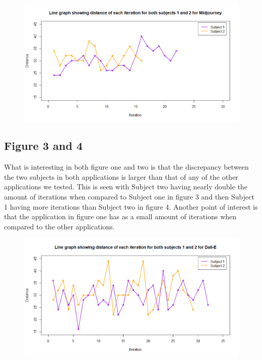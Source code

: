 \documentclass[]{report}
\begin{document}
\begin{figure}[!htbp]
	\centering
	\includegraphics[width=1\linewidth]{LineGraphMidJ}
	\caption{}
	\label{fig:linegraphmidj}
\end{figure}

\subsection{Figure 3 and 4}

What is interesting in both figure one and two is that the discrepancy between the two subjects in both applications is larger than that of any of the other applications we tested. This is seen with Subject two having nearly double the amount of iterations when compared to Subject one in figure 3 and then Subject 1 having more iterations than Subject two in figure 4. Another point of interest is that the application in figure one has as a small amount of iterations when compared to the other applications. 
\begin{figure}[!htbp]
	\centering
	\includegraphics[width=1\linewidth]{LineGraphDall-E}
	\caption{}
	\label{fig:linegraphdall-e}
\end{figure}
\end{document}
